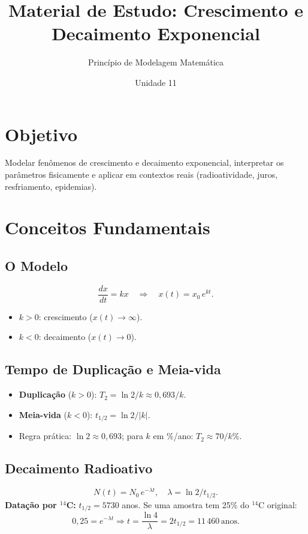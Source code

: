 \documentclass[12pt,a4paper]{article}
\title{Material de Estudo: Crescimento e Decaimento Exponencial}
\author{Princ\'ipio de Modelagem Matem\'atica}
\date{Unidade 11}
\begin{document}
\maketitle

\section*{Objetivo}
Modelar fen\^omenos de crescimento e decaimento exponencial, interpretar os par\^ametros fisicamente e aplicar em contextos reais (radioatividade, juros, resfriamento, epidemias).

\section*{Conceitos Fundamentais}

\subsection*{O Modelo}
\[
\frac{dx}{dt} = kx \quad \Rightarrow \quad x(t) = x_0\,e^{kt}.
\]
\begin{itemize}
  \item $k > 0$: crescimento ($x(t) \to \infty$).
  \item $k < 0$: decaimento ($x(t) \to 0$).
\end{itemize}

\subsection*{Tempo de Duplica\c{c}\~ao e Meia-vida}
\begin{itemize}
  \item \textbf{Duplica\c{c}\~ao} ($k>0$): $T_2 = \ln 2 / k \approx 0{,}693/k$.
  \item \textbf{Meia-vida} ($k<0$): $t_{1/2} = \ln 2 / |k|$.
  \item Regra pr\'atica: $\ln 2 \approx 0{,}693$; para $k$ em \%/ano: $T_2 \approx 70/k\%$.
\end{itemize}

\subsection*{Decaimento Radioativo}
\[
N(t) = N_0\,e^{-\lambda t}, \quad \lambda = \ln 2 / t_{1/2}.
\]
\textbf{Data\c{c}\~ao por ${}^{14}$C:} $t_{1/2} = 5730$ anos. Se uma amostra tem 25\% do ${}^{14}$C original:
\[
0{,}25 = e^{-\lambda t} \Rightarrow t = \frac{\ln 4}{\lambda} = 2t_{1/2} = 11\,460\,\text{anos}.
\]
\end{document}
